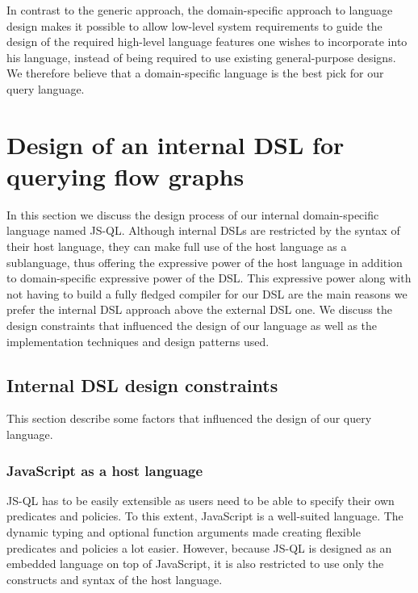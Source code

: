 In contrast to the generic approach, the domain-specific approach to language design makes it possible to allow low-level system requirements to guide the design of the required high-level language features one wishes to incorporate into his language, instead of being required to use existing general-purpose designs.
We therefore believe that a domain-specific language is the best pick for our query language.

\section{Design of an internal DSL for querying flow graphs}
\label{sec:DesignInternalDSL}

In this section we discuss the design process of our internal domain-specific language named JS-QL.
Although internal DSLs are restricted by the syntax of their host language, they can make full use of the host language as a sublanguage, thus offering the expressive power of the host language in addition to domain-specific expressive power of the DSL. This expressive power along with not having to build a fully fledged compiler for our DSL are the main reasons we prefer the internal DSL approach above the external DSL one. We discuss the design constraints that influenced the design of our language as well as the implementation techniques and design patterns used.

\subsection{Internal DSL design constraints}

This section describe some factors that influenced the design of our query language.

\subsubsection{JavaScript as a host language}

JS-QL has to be easily extensible as users need to be able to specify their own predicates and policies. To this extent, JavaScript is a well-suited language. The dynamic typing and optional function arguments made creating flexible predicates and policies a lot easier. However, because JS-QL is designed as an embedded language on top of JavaScript, it is also restricted to use only the constructs and syntax of the host language.

